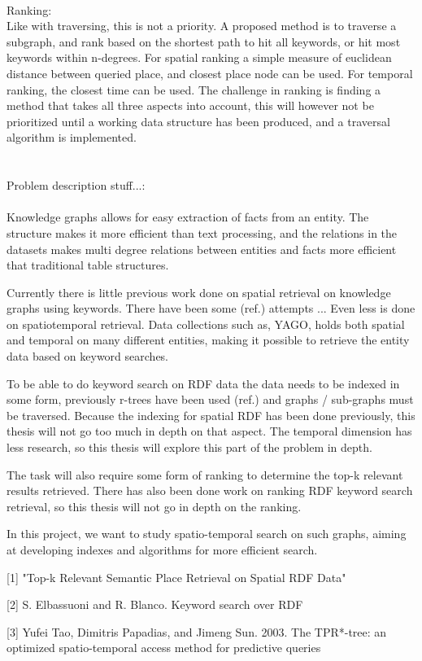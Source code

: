 \\
Ranking:\\
Like with traversing, this is not a priority. A proposed method is to traverse a subgraph, and rank based on the shortest path to hit all keywords, or hit most keywords within n-degrees. For spatial ranking a simple measure of euclidean distance between queried place, and closest place node can be used. For temporal ranking, the closest time can be used. The challenge in ranking is finding a method that takes all three aspects into account, this will however not be prioritized until a working data structure has been produced, and a traversal algorithm is implemented.\\
\\
\\

Problem description stuff...:\\
\\
Knowledge graphs allows for easy extraction of facts from an entity. The structure makes it more efficient than text processing, and the relations in the datasets makes multi degree relations between entities and facts more efficient that traditional table structures.


Currently there is little previous work done on spatial retrieval on knowledge graphs using keywords. There have been some (ref.) attempts ...
Even less is done on spatiotemporal retrieval. Data collections such as, YAGO, holds both spatial and temporal on many different entities, making it possible to retrieve the entity data based on keyword searches.

To be able to do keyword search on RDF data the data needs to be indexed in some form, previously r-trees have been used (ref.) and graphs / sub-graphs must be traversed. Because the indexing for spatial RDF has been done previously, this thesis will not go too much in depth on that aspect. The temporal dimension has less research, so this thesis will explore this part of the problem in depth.

The task will also require some form of ranking to determine the top-k relevant results retrieved. There has also been done work on ranking RDF keyword search retrieval, so this thesis will not go in depth on the ranking. %


In this project, we want to study spatio-temporal search on such graphs, aiming at developing indexes and algorithms for more efficient search.

[1]
"Top-k Relevant Semantic Place Retrieval on Spatial RDF Data"

[2]
S. Elbassuoni and R. Blanco. Keyword search over RDF

[3]
Yufei Tao, Dimitris Papadias, and Jimeng Sun. 2003. The TPR*-tree: an optimized spatio-temporal access method for predictive queries


\clearpage